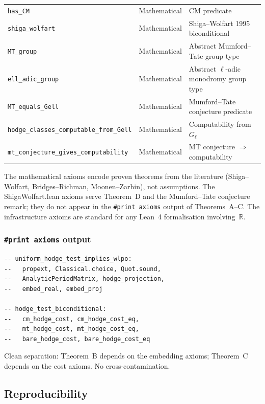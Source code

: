 \documentclass[11pt]{article}
\theoremstyle{plain}
\theoremstyle{definition}
\theoremstyle{remark}
\newcommand{\R}{\mathbb{R}}
\begin{document}
\begin{center}
\begin{tabular}{lll}
\texttt{has\_CM} & Mathematical & CM predicate \\
\texttt{shiga\_wolfart} & Mathematical & Shiga--Wolfart 1995 biconditional \\
\texttt{MT\_group} & Mathematical & Abstract Mumford--Tate group type \\
\texttt{ell\_adic\_group} & Mathematical & Abstract $\ell$-adic monodromy group type \\
\texttt{MT\_equals\_Gell} & Mathematical & Mumford--Tate conjecture predicate \\
\texttt{hodge\_classes\_computable\_from\_Gell} & Mathematical & Computability from $G_\ell$ \\
\texttt{mt\_conjecture\_gives\_computability} & Mathematical & MT conjecture $\Rightarrow$ computability \\
\bottomrule
\end{tabular}
\end{center}

The mathematical axioms encode proven theorems from the literature (Shiga--Wolfart, Bridges--Richman, Moonen--Zarhin), not assumptions. The ShigaWolfart.lean axioms serve Theorem~D and the Mumford--Tate conjecture remark; they do not appear in the \texttt{\#print axioms} output of Theorems~A--C. The infrastructure axioms are standard for any Lean~4 formalisation involving~$\R$.

\subsubsection{\texttt{\#print axioms} output}

\begin{lstlisting}[style=leanstyle,numbers=none]
-- uniform_hodge_test_implies_wlpo:
--   propext, Classical.choice, Quot.sound,
--   AnalyticPeriodMatrix, hodge_projection,
--   embed_real, embed_proj

-- hodge_test_biconditional:
--   cm_hodge_cost, cm_hodge_cost_eq,
--   mt_hodge_cost, mt_hodge_cost_eq,
--   bare_hodge_cost, bare_hodge_cost_eq
\end{lstlisting}

Clean separation: Theorem~B depends on the embedding axioms; Theorem~C depends on the cost axioms. No cross-contamination.

\subsection{Reproducibility}
\end{document}
